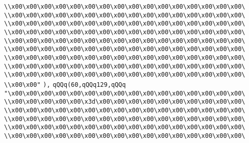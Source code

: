 \verb|\\x00\x00\x00\x00\x00\x00\x00\x00\x00\x00\x00\x00\x00\x00\x00\x00\|\newline
\verb|\\x00\x00\x00\x00\x00\x00\x00\x00\x00\x00\x00\x00\x00\x00\x00\x00\|\newline
\verb|\\x00\x00\x00\x00\x00\x00\x00\x00\x00\x00\x00\x00\x00\x00\x00\x00\|\newline
\verb|\\x00\x00\x00\x00\x00\x00\x00\x00\x00\x00\x00\x00\x00\x00\x00\x00\|\newline
\verb|\\x00\x00\x00\x00\x00\x00\x00\x00\x00\x00\x00\x00\x00\x00\x00\x00\|\newline
\verb|\\x00\x00\x00\x00\x00\x00\x00\x00\x00\x00\x00\x00\x00\x00\x00\x00\|\newline
\verb|\\x00\x00\x00\x00\x00\x00\x00\x00\x00\x00\x00\x00\x00\x00\x00\x00\|\newline
\verb|\\x00\x00\x00\x00\x00\x00\x00\x00\x00\x00\x00\x00\x00\x00\x00\x00\|\newline
\verb|\\x00\x00\x00\x00\x00\x00\x00\x00\x00\x00\x00\x00\x00\x00\x00\x00\|\newline
\verb|\\x00\x00"|\newline
\verb|),|\newline
\verb|qQQq(60,qQQq129,qQQq|\newline
\verb|"\x00\x00\x00\x00\x00\x00\x00\x00\x00\x00\x00\x00\x00\x00\x00\x00\|\newline
\verb|\\x00\x00\x00\x00\x00\x3d\x00\x00\x00\x00\x00\x00\x00\x00\x00\x00\|\newline
\verb|\\x00\x00\x00\x00\x00\x00\x00\x00\x00\x00\x00\x00\x00\x00\x00\x00\|\newline
\verb|\\x00\x00\x00\x00\x00\x00\x00\x00\x00\x00\x00\x00\x00\x00\x00\x00\|\newline
\verb|\\x00\x00\x00\x00\x00\x00\x00\x00\x00\x00\x00\x00\x00\x00\x00\x00\|\newline
\verb|\\x00\x00\x00\x00\x00\x00\x00\x00\x00\x00\x00\x00\x00\x00\x00\x00\|\newline
